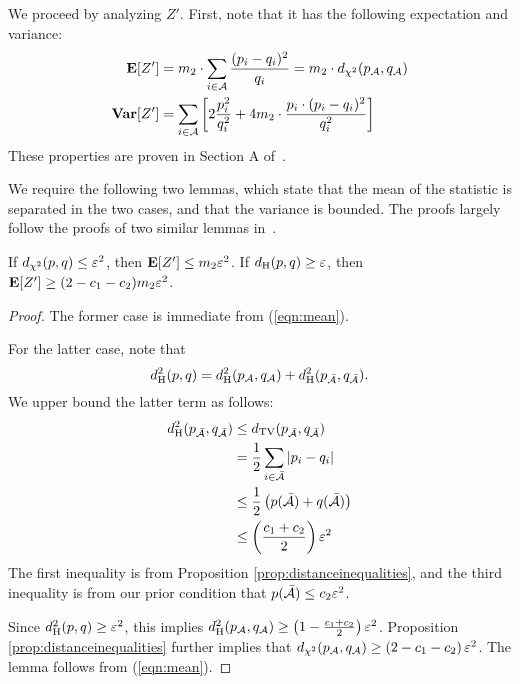 We proceed by analyzing $Z'$.
First, note that it has the following expectation and variance:
\begin{align}
\mbox{\bf E}[Z'] &= m_2 \cdot \sum_{i \in \mathcal{A}} \frac{(p_i - q_i)^2}{q_i} = m_2 \cdot d_{\chi^2}(p_\mathcal{A}, q_\mathcal{A}) \label{eqn:mean} \\
\mbox{\bf Var}[Z'] &= \sum_{i \in \mathcal{A}} \left[2\frac{p_i^2}{q_i^2} + 4m_2 \cdot \frac{p_i \cdot (p_i - q_i)^2}{q_i^2}\right] \label{eqn:variance}
\end{align}
These properties are proven in Section A of~\cite{AcharyaDK15}.

We require the following two lemmas, which state that the mean of the statistic is separated in the two cases, and that the variance is bounded.
The proofs largely follow the proofs of two similar lemmas in~\cite{AcharyaDK15}.
\begin{lemma}
\label{lem:means}
If $d_{\chi^2}(p,q) \leq \varepsilon^2$, then $\mbox{\bf E}[Z'] \leq m_2 \varepsilon^2$. 
If $d_{\mathrm {H}}(p,q) \geq \varepsilon$, then $\mbox{\bf E}[Z'] \geq (2 - c_1 - c_2)m_2 \varepsilon^2$.
\end{lemma}
\begin{proof}
The former case is immediate from (\ref{eqn:mean}).

For the latter case, note that
$$d_{\mathrm {H}}^2(p,q) = d_{\mathrm {H}}^2(p_\mathcal{A}, q_\mathcal{A}) + d_{\mathrm {H}}^2(p_\mathcal{\bar A}, q_\mathcal{\bar A}).$$
We upper bound the latter term as follows:
\begin{align*}
d_{\mathrm {H}}^2(p_\mathcal{\bar A}, q_\mathcal{\bar A}) 
&\leq d_{\mathrm {TV}}(p_\mathcal{\bar A}, q_\mathcal{\bar A}) \\
&= \frac12 \sum_{i \in \mathcal{\bar A}} |p_i - q_i| \\
&\leq \frac12 \left(p(\mathcal{\bar A}) + q(\mathcal{\bar A})\right) \\
&\leq \left(\frac{c_1 + c_2}{2}\right)\varepsilon^2 \\
\end{align*}
The first inequality is from Proposition \ref{prop:distanceinequalities}, and the third inequality is from our prior condition that $p(\mathcal{\bar A}) \leq c_2 \varepsilon^2$.

Since $d_{\mathrm {H}}^2(p,q) \geq \varepsilon^2$, this implies $d_{\mathrm {H}}^2(p_\mathcal{A}, q_\mathcal{A}) \geq \left(1 - \frac{c_1 + c_2}{2}\right)\varepsilon^2$.
Proposition \ref{prop:distanceinequalities} further implies that $d_{\chi^2}(p_\mathcal{A}, q_\mathcal{A}) \geq \left(2 - c_1 - c_2\right)\varepsilon^2$.
The lemma follows from (\ref{eqn:mean}).
\end{proof}


